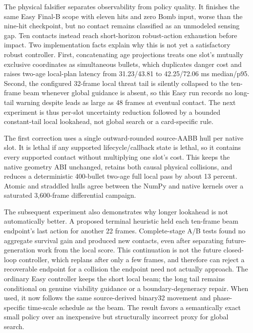 \documentclass[10pt]{article}
\begin{document}
The physical falsifier separates observability from policy quality.  It
finishes the same Easy Final-B scope with eleven hits and zero Bomb input,
worse than the nine-hit checkpoint, but no contact remains classified as an
unmodeled sensing gap.  Ten contacts instead reach short-horizon robust-action
exhaustion before impact.  Two implementation facts explain why this is not
yet a satisfactory robust controller.  First, concatenating age projections
treats one slot's mutually exclusive coordinates as simultaneous bullets,
which duplicates danger cost and raises two-age local-plan latency from
31.23/43.81 to 42.25/72.06 ms median/p95.  Second, the configured 32-frame
local threat tail is silently collapsed to the ten-frame beam whenever global
guidance is absent, so this Easy run records no long-tail warning despite
leads as large as 48 frames at eventual contact.  The next experiment is thus
per-slot uncertainty reduction followed by a bounded constant-tail local
lookahead, not global search or a card-specific rule.

The first correction uses a single outward-rounded source-AABB hull per native
slot.  It is lethal if any supported lifecycle/callback state is lethal, so it
contains every supported contact without multiplying one slot's cost.  This
keeps the native geometry ABI unchanged, retains both causal physical
collisions, and reduces a deterministic 400-bullet two-age full local pass by
about 13 percent.  Atomic and straddled hulls agree between the NumPy and
native kernels over a saturated 3,600-frame differential campaign.

The subsequent experiment also demonstrates why longer lookahead is not
automatically better.  A proposed terminal heuristic held each ten-frame beam
endpoint's last action for another 22 frames.  Complete-stage A/B tests found
no aggregate survival gain and produced new contacts, even after separating
future-generation work from the local score.  This continuation is not the
future closed-loop controller, which replans after only a few frames, and
therefore can reject a recoverable endpoint for a collision the endpoint need
not actually approach.  The ordinary Easy controller keeps the short local
beam; the long tail remains conditional on genuine viability guidance or a
boundary-degeneracy repair.  When used, it now follows the same
source-derived binary32 movement and phase-specific time-scale schedule as the
beam.  The result favors a semantically exact small policy over an inexpensive
but structurally incorrect proxy for global search.
\end{document}
